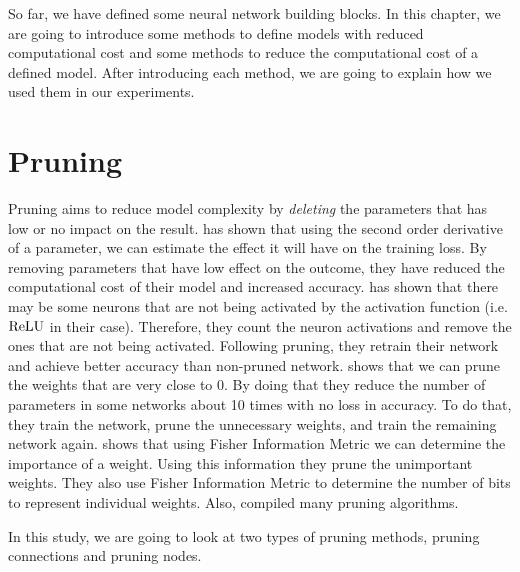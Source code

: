 \label{cha:methods}
So far, we have defined some neural network building blocks. In this chapter, we are going to introduce some methods to define models with reduced computational cost and some methods to reduce the computational cost of a defined model. After introducing each method, we are going to explain how we used them in our experiments.

\section{Pruning}
\label{sec:pruning}
Pruning aims to reduce model complexity by \textit{deleting} the parameters that has low or no impact on the result. \cite{lecun1989optimal} has shown that using the second order derivative of a parameter, we can estimate the effect it will have on the training loss. By removing parameters that have low effect on the outcome, they have reduced the computational cost of their model and increased accuracy. \cite{Hu:2016aa} has shown that there may be some neurons that are not being activated by the activation function (i.e. $\textrm{ReLU}$ in their case). Therefore, they count the neuron activations and remove the ones that are not being activated. Following pruning, they retrain their network and achieve better accuracy than non-pruned network. \cite{han2015learning} shows that we can prune the weights that are very close to 0. By doing that they reduce the number of parameters in some networks about 10 times with no loss in accuracy. To do that, they train the network, prune the unnecessary weights, and train the remaining network again.  \cite{tu2016reducing} shows that using Fisher Information Metric we can determine the importance of a weight. Using this information they prune the unimportant weights. They also use Fisher Information Metric to determine the number of bits to represent individual weights. Also, \cite{reed1993pruning} compiled many pruning algorithms. 

In this study, we are going to look at two types of pruning methods, pruning connections and pruning nodes.

